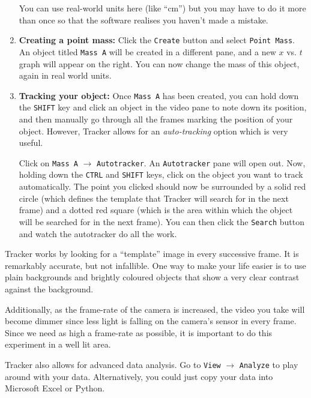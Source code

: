 \begin{enumerate}
    \begin{tip}
    You can use real-world units here (like ``cm'') but you may have to do it more than once so that the software realises you haven't made a mistake.
    \end{tip}
    
    \item \textbf{Creating a point mass: } Click the \texttt{Create} button and select \texttt{Point Mass}. An object titled \texttt{Mass A} will be created in a different pane, and a new $x$ vs. $t$ graph will appear on the right. You can now change the mass of this object, again in real world units.
    
    \item \textbf{Tracking your object: } Once \texttt{Mass A} has been created, you can hold down the \texttt{SHIFT} key and click an object in the video pane to note down its position, and then manually go through all the frames marking the position of your object. However, Tracker allows for an \textsl{auto-tracking} option which is very useful. 

    Click on \texttt{Mass A} $\rightarrow$ \texttt{Autotracker}. An \texttt{Autotracker} pane will open out. Now, holding down the \texttt{CTRL} and \texttt{SHIFT} keys, click on the object you want to track automatically. The point you clicked should now be surrounded by a solid red circle (which defines the template that Tracker will search for in the next frame) and a dotted red square (which is the area within which the object will be searched for in the next frame). You can then click the \texttt{Search} button and watch the autotracker do all the work.
\end{enumerate}

\begin{imp}
Tracker works by looking for a ``template'' image in every successive frame. It is remarkably accurate, but not infallible. One way to make your life easier is to use plain backgrounds and brightly coloured objects that show a very clear contrast against the background.

Additionally, as the frame-rate of the camera is increased, the video you take will become dimmer since less light is falling on the camera's sensor in every frame. Since we need as high a frame-rate as possible, it is important to do this experiment in a well lit area.

Tracker also allows for advanced data analysis. Go to \texttt{View} $\rightarrow$ \texttt{Analyze} to play around with your data. Alternatively, you could just copy your data into Microsoft Excel or Python.
\end{imp}

